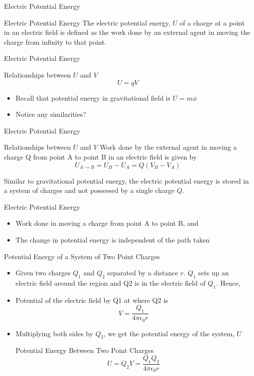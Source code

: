 \documentclass{beamer}
\begin{document}
\begin{frame}{Electric Potential Energy}{}
\begin{block}{Electric Potential Energy}
The electric potential energy, \(U\) of a charge at a point in an electric field is defined as the work done by an external agent in moving the charge from infinity to that point.
\end{block}
\end{frame}

\begin{frame}{Electric Potential Energy}{}
\begin{block}{Relationships between \(U\) and \(V\)}
\[U=qV\]
\end{block}
  \begin{itemize}
  \item Recall that potential energy in gravitational field is \(U=m\phi \)
  \item Notice any similarities?
  \end{itemize}
\end{frame}

\begin{frame}{Electric Potential Energy}{}
\begin{block}{Relationships between \(U\) and \(V\)}
Work done by the external agent in moving a charge Q from point A to point B in an electric field is given by
\[U_{A\to B}=U_B-U_A=Q(V_B-V_A)\]
\end{block}
Similar to gravitational potential energy, the electric potential energy is stored in a system of charges and not possessed by a single charge \(Q\).
\end{frame}

\begin{frame}{Electric Potential Energy}{}
  \begin{itemize}
  \item Work done in moving a charge from point A to point B, and 
  \item The change in potential energy is independent of the path taken
  \end{itemize}
\end{frame}

\begin{frame}{Potential Energy of a System of Two Point Charges}{}
  \begin{itemize}
  \item Given two charges \(Q_1\) and \(Q_2\) separated by a distance \(r\). \(Q_1\) sets up an electric field around the region and Q2 is in the electric field of \(Q_1\). Hence, 
  \item Potential of the electric field by Q1 at where Q2 is	 \[V=\frac{Q_1}{4\pi \epsilon_0 r}\]
  \item Multiplying both sides by \(Q_2\), we get the potential energy of the system, \(U\)
\begin{block}{Potential Energy Between Two Point Charges}
  \[U=Q_2V = \frac{Q_1Q_2}{4\pi \epsilon_0 r}\]
\end{block}
    \end{itemize}
\end{frame}
\end{document}
